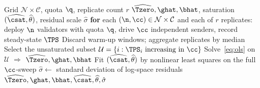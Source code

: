 \begin{Algorithm}[!t]
\caption{Bi-factor calibration under the \RNM{} protocol}
\label{alg:calibration}
\REQUIRE Grid $\mathcal{N}\times\mathcal{C}$, quota $\q$, replicate count $r$
\ENSURE $\widehat{\Tzero},\ghat,\bhat$, saturation $(\widehat{\csat},
        \widehat{\theta})$, residual scale $\hat\sigma$
\STATE \textbf{for} each $(\n,\cc)\in\mathcal{N}\times\mathcal{C}$ and each of
       $r$ replicates: deploy $\n$ validators with quota $\q$, drive $\cc$
       independent senders, record steady-state $\TPS$
\STATE Discard warm-up windows; aggregate replicates by median
\STATE Select the unsaturated subset $\mathcal{U}=\{i:\TPS_{i}\ \text{increasing
       in}\ \cc\}$
\STATE Solve~\eqref{eq:ols} on $\mathcal{U}$ $\Rightarrow$
       $\widehat{\Tzero},\ghat,\bhat$
\STATE Fit $(\widehat{\csat},\widehat{\theta})$ by nonlinear least squares on
       the full $\cc$-sweep
\STATE $\hat\sigma\leftarrow$ standard deviation of log-space residuals
\STATE \RET $\widehat{\Tzero},\ghat,\bhat,\widehat{\csat},\widehat{\theta},\hat\sigma$
\end{Algorithm}
